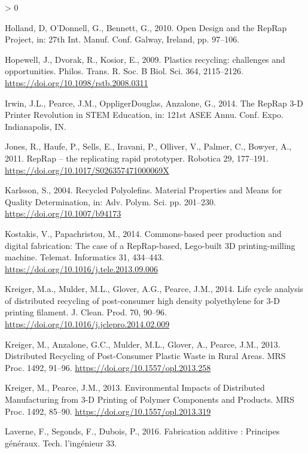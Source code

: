 \documentclass[
]{article}
\newlength{\cslhangindent}
\newenvironment{CSLReferences}[2] %
 {%
  \setlength{\parindent}{0pt}
  \ifodd #1 \everypar{\setlength{\hangindent}{\cslhangindent}}\ignorespaces\fi
  \ifnum #2 > 0
  \setlength{\parskip}{#2\baselineskip}
  \fi
 }%
 {}
\begin{document}
\begin{CSLReferences}{1}{0}
\leavevmode\hypertarget{ref-Holland2010}{}%
Holland, D, O'Donnell, G., Bennett, G., 2010. {Open Design and the RepRap Project}, in: 27th Int. Manuf. Conf. Galway, Ireland, pp. 97--106.

\leavevmode\hypertarget{ref-Hopewell2009}{}%
Hopewell, J., Dvorak, R., Kosior, E., 2009. {Plastics recycling: challenges and opportunities}. Philos. Trans. R. Soc. B Biol. Sci. 364, 2115--2126. \url{https://doi.org/10.1098/rstb.2008.0311}

\leavevmode\hypertarget{ref-Irwin2014}{}%
Irwin, J.L., Pearce, J.M., OppligerDouglas, Anzalone, G., 2014. {The RepRap 3-D Printer Revolution in STEM Education}, in: 121st ASEE Annu. Conf. Expo. Indianapolis, IN.

\leavevmode\hypertarget{ref-Jones2011}{}%
Jones, R., Haufe, P., Sells, E., Iravani, P., Olliver, V., Palmer, C., Bowyer, A., 2011. {RepRap -- the replicating rapid prototyper}. Robotica 29, 177--191. \url{https://doi.org/10.1017/S026357471000069X}

\leavevmode\hypertarget{ref-Karlsson2004}{}%
Karlsson, S., 2004. {Recycled Polyolefins. Material Properties and Means for Quality Determination}, in: Adv. Polym. Sci. pp. 201--230. \url{https://doi.org/10.1007/b94173}

\leavevmode\hypertarget{ref-Kostakis2013}{}%
Kostakis, V., Papachristou, M., 2014. {Commons-based peer production and digital fabrication: The case of a RepRap-based, Lego-built 3D printing-milling machine}. Telemat. Informatics 31, 434--443. \url{https://doi.org/10.1016/j.tele.2013.09.006}

\leavevmode\hypertarget{ref-Kreiger2014}{}%
Kreiger, M.a., Mulder, M.L., Glover, A.G., Pearce, J.M., 2014. {Life cycle analysis of distributed recycling of post-consumer high density polyethylene for 3-D printing filament}. J. Clean. Prod. 70, 90--96. \url{https://doi.org/10.1016/j.jclepro.2014.02.009}

\leavevmode\hypertarget{ref-Anzalone2013}{}%
Kreiger, M., Anzalone, G.C., Mulder, M.L., Glover, A., Pearce, J.M., 2013. {Distributed Recycling of Post-Consumer Plastic Waste in Rural Areas}. MRS Proc. 1492, 91--96. \url{https://doi.org/10.1557/opl.2013.258}

\leavevmode\hypertarget{ref-Kreiger2013}{}%
Kreiger, M., Pearce, J.M., 2013. {Environmental Impacts of Distributed Manufacturing from 3-D Printing of Polymer Components and Products}. MRS Proc. 1492, 85--90. \url{https://doi.org/10.1557/opl.2013.319}

\leavevmode\hypertarget{ref-Laverne2016}{}%
Laverne, F., Segonds, F., Dubois, P., 2016. {Fabrication additive : Principes g{é}n{é}raux}. Tech. l'ing{é}nieur 33.


\end{CSLReferences}
\end{document}
